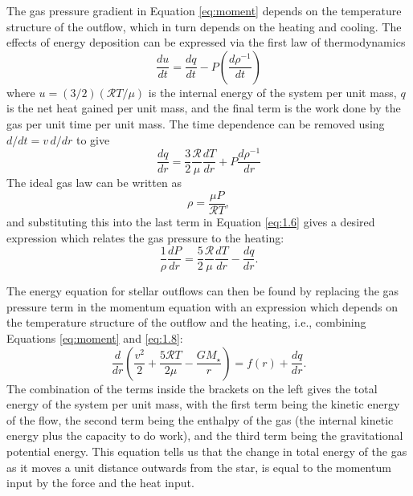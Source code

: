 The gas pressure gradient in Equation \ref{eq:moment} depends on the temperature structure of the outflow, which in turn depends on the heating and cooling. The effects of energy deposition can be expressed via the first law of thermodynamics 
\begin{equation}
\frac{du}{dt}=\frac{dq}{dt}-P\left(\frac{d\rho ^{-1}}{dt} \right)
\end{equation}
where $u=(3/2)(\mathcal{R}T/\mu)$ is the internal energy of the system per unit mass, $q$ is the net heat gained per unit mass, and the final term is the work done by the gas per unit time per unit mass. The time dependence can be removed using $d/dt=v\,d/dr$ to give
\begin{equation}\label{eq:1.6}
\frac{dq}{dr}=\frac{3}{2}\frac{\mathcal{R}}{\mu}\frac{dT}{dr}+P\frac{d\rho ^{-1}}{dr}
\end{equation}
The ideal gas law can be written as 
\begin{equation}
\rho = \frac{\mu P}{\mathcal{R}T},
\end{equation}
and substituting this into the last term in Equation \ref{eq:1.6} gives a desired expression which relates the gas pressure to the heating:
\begin{equation}\label{eq:1.8}
\frac{1}{\rho}\dfrac{dP}{dr}=\dfrac{5}{2}\dfrac{\mathcal{R}}{\mu}\dfrac{dT}{dr}-\frac{dq}{dr}.
\end{equation}

The energy equation for stellar outflows can then be found by replacing the gas pressure term in the momentum equation with an expression which depends on the temperature structure of the outflow and the heating, i.e., combining Equations \ref{eq:moment} and \ref{eq:1.8}:
\begin{equation}
\frac{d}{dr}\left(\frac{v^2}{2} + \frac{5\mathcal{R}T}{2\mu}-\frac{GM_{\star}}{r}\right)= f(r)+\frac{dq}{dr}.
\end{equation}
The combination of the terms inside the brackets on the left gives the total energy of the system per unit mass, with the first term being the kinetic energy of the flow, the second term being the enthalpy of the gas (the internal kinetic energy plus the capacity to do work), and the third term being the gravitational potential energy.  This equation tells us that the change in total energy of the gas as it moves a unit distance outwards from the star, is equal to the momentum input by the force and the heat input.

